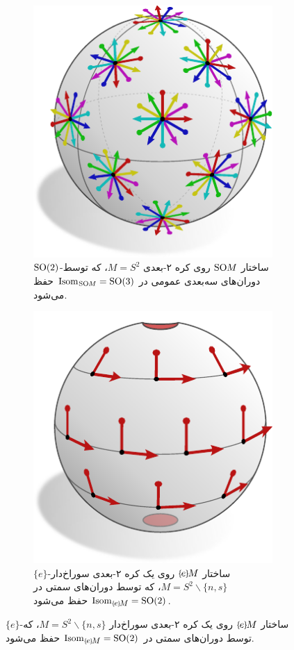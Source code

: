 \begin{figure}
    \centering
    \begin{subfigure}[b]{0.48\textwidth}
        \centering
        \includegraphics[width=.66\textwidth]{figures/G_structure_S2_1.pdf}
        \captionsetup{format=hang, width=.9\textwidth}
        \caption{\small
            $\operatorname{SO}(2)$-ساختار $\operatorname{SO}\mkern-3.6muM$ روی کره ۲-بعدی $M=S^2$، که توسط دوران‌های سه‌بعدی عمومی در $\operatorname{Isom}_{\mkern1mu\operatorname{SO}\mkern-3.6muM} = \operatorname{SO}(3)$ حفظ می‌شود.
        }
        \label{fig:G_structure_S2_1}
    \end{subfigure}
    \hfill
    \begin{subfigure}[b]{0.48\textwidth}
        \centering
        \includegraphics[width=.66\textwidth]{figures/G_structure_S2_2.pdf}
        \captionsetup{format=hang, width=.9\textwidth}
        \caption{\small
            $\{e\}$-ساختار $\eM$ روی یک کره ۲-بعدی سوراخ‌دار $M = S^2 \backslash \{n,s\}$، که توسط دوران‌های سمتی در $\IsomeM = \SO2$ حفظ می‌شود.
}
\end{subfigure}
\end{figure}

